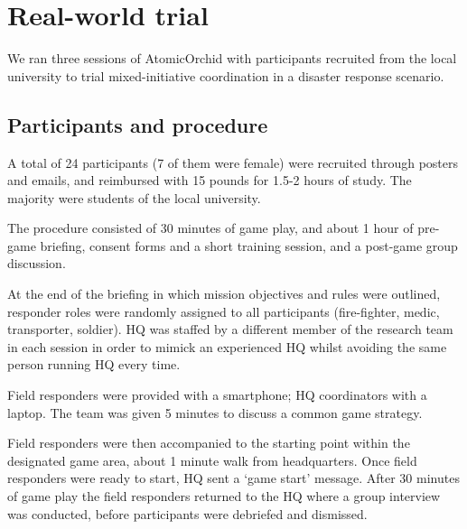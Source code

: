  




\section{Real-world trial}
We ran three sessions of AtomicOrchid with participants recruited from the local university to trial mixed-initiative coordination in a disaster response scenario. 

\subsection{Participants and procedure}
A total of 24 participants (7 of them were female) were recruited through posters and emails, and reimbursed with 15 pounds for 1.5-2 hours of study. The majority were students of the local university.

The procedure consisted of 30 minutes of game play, and about 1 hour of pre-game briefing, consent forms and a short training session, and a post-game group discussion. 


At the end of the briefing in which mission objectives and rules were outlined, responder roles were randomly assigned to all participants (fire-fighter, medic, transporter, soldier). HQ was staffed by a different member of the research team in each session in order to mimick an experienced HQ whilst avoiding the same person running HQ every time. 

Field responders were provided with a smartphone; HQ coordinators with a laptop. The team was given 5 minutes to discuss a common game strategy. 


Field responders were then accompanied to the starting point within the designated game area, about 1 minute walk from headquarters. Once field responders were ready to start, HQ sent a `game start' message. After 30 minutes of game play the field responders returned to the HQ where a group interview was conducted, before participants were debriefed and dismissed.

